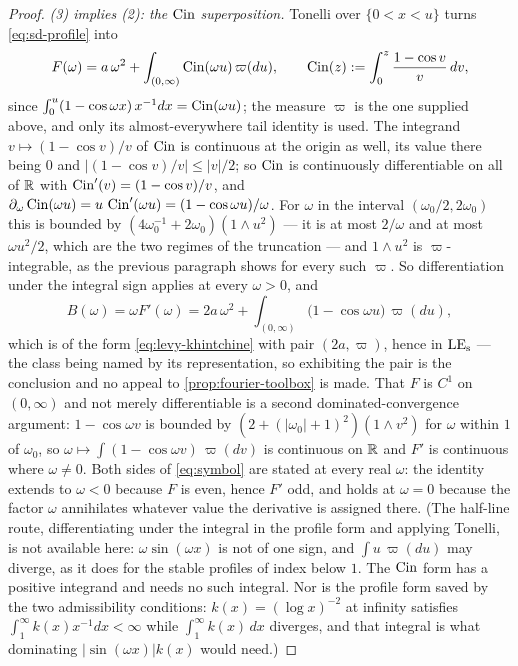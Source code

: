 \begin{proof}
\emph{(3) implies (2): the $\operatorname{Cin}$ superposition.} Tonelli over $\{0 < x < u\}$ turns
\ref{eq:sd-profile} into
\begin{equation}\label{eq:cin-superposition}
  F(\omega) = a\,\omega^2 + \int_{(0,\infty)} \operatorname{Cin}(\omega u)\,\varpi(du),
  \qquad \operatorname{Cin}(z) := \int_0^{z}\frac{1 - \cos v}{v}\,dv,
\end{equation}
since $\int_0^u (1-\cos\omega x)\,x^{-1}dx = \operatorname{Cin}(\omega u)$; the measure $\varpi$ is the one
supplied above, and only its almost-everywhere tail identity is used. The integrand
$v \mapsto (1-\cos v)/v$ of $\operatorname{Cin}$ is continuous at the origin as well, its value there being
$0$ and $|(1-\cos v)/v| \le |v|/2$; so $\operatorname{Cin}$ is continuously differentiable on all of $\mathbb{R}$
with $\operatorname{Cin}'(v) = (1-\cos v)/v$, and
$\partial_\omega \operatorname{Cin}(\omega u) = u\,\operatorname{Cin}'(\omega u) = (1 - \cos\omega u)/\omega$. For $\omega$
in the interval $(\omega_0/2, 2\omega_0)$ this is bounded by
$(4\omega_0^{-1} + 2\omega_0)(1 \wedge u^2)$ --- it is at most $2/\omega$ and at most
$\omega u^2/2$, which are the two regimes of the truncation --- and $1 \wedge u^2$ is
$\varpi$-integrable, as the previous paragraph shows for every such $\varpi$. So
differentiation under the integral sign applies at every $\omega > 0$, and
\begin{equation}\label{eq:symbol}
  B(\omega) = \omega F'(\omega)
   = 2a\,\omega^2 + \int_{(0,\infty)} \bigl(1 - \cos\omega u\bigr)\,\varpi(du),
\end{equation}
which is of the form \ref{eq:levy-khintchine} with pair $(2a,\varpi)$, hence in $\mathrm{LE}_{\mathrm{s}}$ --- the
class being named by its representation, so exhibiting the pair is the conclusion and no appeal
to \ref{prop:fourier-toolbox} is made. That $F$ is $C^1$ on $(0,\infty)$ and not merely
differentiable is a second dominated-convergence argument: $1 - \cos\omega v$ is bounded by
$(2 + (|\omega_0|+1)^2)(1 \wedge v^2)$ for $\omega$ within $1$ of $\omega_0$, so
$\omega \mapsto \int (1 - \cos\omega v)\,\varpi(dv)$ is continuous on $\mathbb{R}$ and $F' $ is
continuous where $\omega \ne 0$. Both sides of \ref{eq:symbol} are stated at every real
$\omega$: the identity extends to $\omega < 0$ because $F$ is even, hence $F'$ odd, and holds
at $\omega = 0$ because the factor $\omega$ annihilates whatever value the derivative is
assigned there. (The half-line route, differentiating under the integral in the profile form and
applying Tonelli, is not available here: $\omega\sin(\omega x)$ is not of one sign, and
$\int u\,\varpi(du)$ may diverge, as it does for the stable profiles of index below $1$. The
$\operatorname{Cin}$ form has a positive integrand and needs no such integral. Nor is the profile form saved
by the two admissibility conditions: $k(x) = (\log x)^{-2}$ at infinity satisfies
$\int_1^\infty k(x)x^{-1}dx < \infty$ while $\int_1^\infty k(x)\,dx$ diverges, and that
integral is what dominating $|\sin(\omega x)|k(x)$ would need.)


\end{proof}
